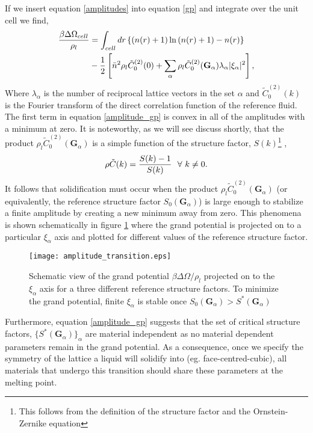 If we insert equation \ref{amplitudes} into equation \ref{gp} and integrate
over the unit cell we find,
%
\begin{align}
    \label{amplitude_gp} 
    \frac{\beta \Delta\Omega_{cell}}{\rho_l} &=  \int_{cell} 
        dr \left\lbrace (n(r) + 1)\ln\left(n(r) + 1\right) - n(r) \right\rbrace \nonumber \\
    &- \frac{1}{2} \left[\bar{n} ^ 2 \rho_l\tilde{C}^{(2)}_0(0) + \sum_\alpha\rho_l\tilde{C}^{(2)}_0
            (\mathbf{G}_\alpha) \lambda_\alpha\vert\xi_\alpha\vert^2\right],
\end{align}
%
Where $\lambda_\alpha$ is the number of reciprocal lattice vectors in the set
$\alpha$ and $\tilde{C}^{(2)}_0(k)$ is the Fourier transform of the direct
correlation function of the reference fluid. The first term in equation
\ref{amplitude_gp} is convex in all of the amplitudes with a minimum at zero.
It is noteworthy, as we will see discuss shortly, that the product 
$\rho_l \tilde{C}^{(2)}_0(\mathbf{G}_\alpha)$ is a simple function of the 
structure factor, $S(k)$\footnote{This follows from the definition of the 
structure factor and the Ornstein-Zernike equation}
,
%
\begin{equation}
    \rho \tilde{C}(k) = \frac{S(k) - 1}{S(k)}\,\,\,\,\forall \,\,k \ne 0.
\end{equation}
%
It follows that solidification must occur when the product $\rho_l
\tilde{C}^{(2)}_0(\mathbf{G}_\alpha)$ (or equivalently, the reference structure
factor $S_0(\mathbf{G}_\alpha)$) is large enough to stabilize a finite
amplitude by creating a new minimum away from zero.  This phenomena is shown
schematically in figure \ref{fig:amplitude_transition} where the grand
potential is projected on to a particular $\xi_\alpha$ axis and plotted for
different values of the reference structure factor.
%
\begin{figure}
    \centering
    \texttt{[image: amplitude\_transition.eps]}
    \caption{\label{fig:amplitude_transition} 
        Schematic view of the grand potential $\beta\Delta\Omega / \rho_l$
        projected on to the $\xi_\alpha$ axis for a three different reference
        structure factors. To minimize the grand potential, finite $\xi_\alpha$
        is stable once $S_0(\mathbf{G}_\alpha) > S^*(\mathbf{G}_\alpha)$
    }
\end{figure}
%

Furthermore, equation \ref{amplitude_gp} suggests that the set of critical
structure factors, $\lbrace S^*(\mathbf{G}_\alpha)\rbrace_\alpha$ are material
independent as no material dependent parameters remain in the grand potential.
As a consequence, once we specify the symmetry of the lattice a liquid will
solidify into (eg.  face-centred-cubic), all materials that undergo this
transition should share these parameters at the melting point. 

